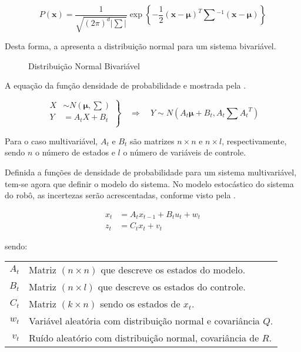 \begin{equation}
    \label{eq::linearNd}
    P(\mathbf{x}) =\frac{1}{\sqrt{(2\pi)^{d}|\sum|}}\exp\left\{-\frac{1}{2} (\mathbf{x}-\boldsymbol\mu)^T\textstyle\sum{}^{-1}(\mathbf{x}-\boldsymbol\mu)\right\}
\end{equation}

Desta forma, a  apresenta a distribuição normal para um sistema bivariável.

\begin{figure}[!ht]
    \centering
    
    \caption{Distribuição Normal Bivariável}
    \label{fig::gauss2}
\end{figure}

A equação da função densidade de probabilidade e mostrada pela .

\begin{equation}
    \left.
    \begin{aligned}
            X & \sim N\left(\boldsymbol\mu, \textstyle\sum\right)\\
            Y & = {A}_tX + {B_t}\\
    \end{aligned} \right\}
    \quad \Rightarrow \quad Y \sim N\left( {A_t}\boldsymbol\mu+B_t, {A_t}\textstyle\sum {A_t}^T \right)
    \label{eq:multi}
\end{equation}

Para o caso multivariável, ${A_t}$ e ${B_t}$ são matrizes $n \times n$ e $n \times l$, respectivamente, sendo $n$ o número de estados e $l$ o número de variáveis de controle.

Definida a funções de densidade de probabilidade para um sistema multivariável, tem-se agora que definir o modelo do sistema. No modelo estocástico do sistema do robô, as incertezas serão acrescentadas, conforme visto pela  .

    \begin{equation} 
        \label{eq::mdinamic}
        \begin{aligned}
            x_t &= {A}_t x_{t-1} + {B}_t u_t +  w_t\\ 
        z_t &= {C}_t x_t + v_t
        \end{aligned}
    \end{equation}

\noindent sendo:

\begin{center}
    \begin{tabular}{ r | l }
        ${A}_t$ & Matriz $(n \times n)$ que descreve os estados do modelo.      \\
        ${B}_t$ & Matriz $(n \times l)$ que descreve os estados do controle.    \\
        ${C}_t$ & Matriz $(k\times n)$ sendo os estados de $x_t$.               \\
        $w_t$   & Variável aleatória com distribuição normal e covariância ${Q}$. \\
        $v_t$   & Ruído aleatório com distribuição normal, covariância de ${R}$.
    \end{tabular}
\end{center}

